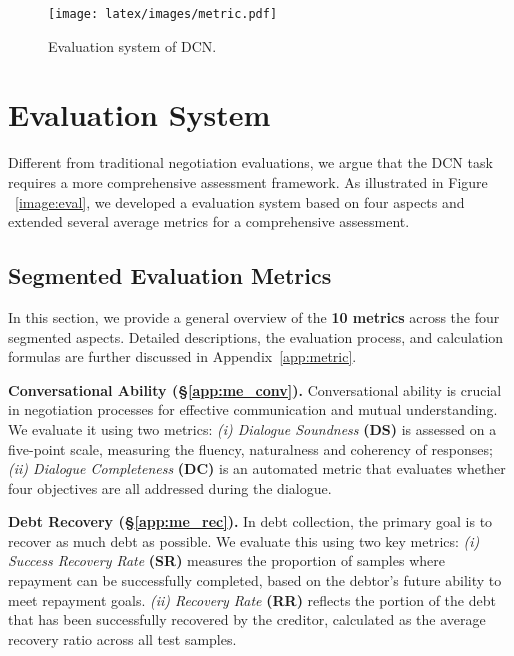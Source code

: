 \begin{figure}[htbp]
\vspace{-0.1in}
  \centering
  \texttt{[image: latex/images/metric.pdf]}  
  \vspace{-0.1in}
  \caption{\label{image:eval}
 Evaluation system of DCN.}
\vspace{-0.1in}
\label{img:metric}
\end{figure}


\section{Evaluation System}\label{sec:eval}

Different from traditional negotiation evaluations, we argue that the DCN task requires a more comprehensive assessment framework. As illustrated in Figure ~\ref{image:eval}, we developed a evaluation system based on four aspects and extended several average metrics for a comprehensive assessment. 


\subsection{Segmented Evaluation Metrics}

In this section, we provide a general overview of the \textbf{10 metrics} across the four segmented aspects. Detailed descriptions, the evaluation process, and calculation formulas are further discussed in Appendix~\ref{app:metric}.

\textbf{Conversational Ability (§\ref{app:me_conv}).} Conversational ability is crucial in negotiation processes for effective communication and mutual understanding. We evaluate it using two metrics: \textit{(i) Dialogue Soundness}\textbf{ (DS)} is assessed on a five-point scale, measuring the fluency, naturalness and coherency of responses; \textit{(ii) Dialogue Completeness}\textbf{ (DC)} is an automated metric that evaluates whether four objectives are all addressed during the dialogue.

\textbf{Debt Recovery (§\ref{app:me_rec}).} In debt collection, the primary goal is to recover as much debt as possible. We evaluate this using two key metrics: \textit{(i) Success Recovery Rate} \textbf{(SR)} measures the proportion of samples where repayment can be successfully completed, based on the debtor’s future ability to meet repayment goals. \textit{(ii) Recovery Rate}\textbf{ (RR)} reflects the portion of the debt that has been successfully recovered by the creditor, calculated as the average recovery ratio across all test samples.

